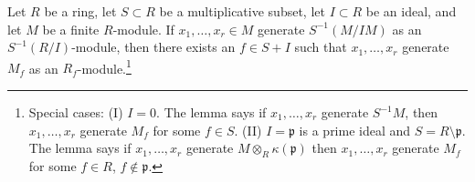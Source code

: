 \begin{lemma}
\label{lemma-NAK-localization}
Let $R$ be a ring, let $S \subset R$ be a multiplicative subset,
let $I \subset R$ be an ideal, and let $M$ be a finite $R$-module.
If $x_1, \ldots, x_r \in M$ generate $S^{-1}(M/IM)$
as an $S^{-1}(R/I)$-module, then there exists an $f \in S + I$
such that $x_1, \ldots, x_r$ generate $M_f$ as an
$R_f$-module.\footnote{Special cases: (I) $I = 0$. The lemma says
if $x_1, \ldots, x_r$ generate $S^{-1}M$, then $x_1, \ldots, x_r$
generate $M_f$ for some $f \in S$. (II) $I = \mathfrak p$ is
a prime ideal and $S = R \setminus \mathfrak p$. The lemma says if
$x_1, \ldots, x_r$ generate $M \otimes_R \kappa(\mathfrak p)$
then $x_1, \ldots, x_r$ generate $M_f$ for some
$f \in R$, $f \not \in \mathfrak p$.}
\end{lemma}

